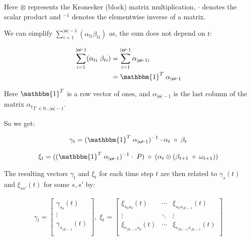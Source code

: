 Here $\otimes$ represents the Kronecker (block) matrix multiplication, $\cdot$ denotes the scalar product and $^{-1}$ denotes the elementwise inverse of a matrix.

We can simplify $\sum_{i=1}^{|\mathbf{o}|-1} (\alpha_{t i} \beta_{t i})$ as, the sum does not depend on $t$:

\begin{align}
    \sum_{i=1}^{|\mathbf{o}|-1} (\alpha_{t i} \; \beta_{t i}) &= \sum_{i=1}^{|\mathbf{o}|-1} \alpha_{|\mathbf{o}|-1 i} \\
    &= \mathbbm{1}^T \; \alpha_{|\mathbf{o}|-1}
\end{align}

Here $\mathbbm{1}^T$ is a row vector of ones, and $\alpha_{|\mathbf{o}|-1}$ is the last column of the matrix ${\alpha_t}_{T \;\in 0\dots|\mathbf{o}|-1}$.

So we get:

\begin{equation}
    {\gamma}_t = (\mathbbm{1}^T \; \alpha_{|\mathbf{o}|-1})^{-1} \cdot \alpha_t \; \circ \; \beta_t
    \label{eq:gamma-matrix-ones}
\end{equation}

\begin{equation}
    {\xi}_t = ((\mathbbm{1}^T \; \alpha_{|\mathbf{o}|-1})^{-1} \cdot \; {P}) \; \circ \;(\alpha_t \otimes (\beta_{t+1} \; \circ \; {\omega}_{t+1}))
    \label{eq:xi-matrix-ones}
\end{equation}

The resulting vectors ${\gamma}_t$ and ${\xi}_t$ for each time step $t$ are then related to $\gamma_s(t)$ and $\xi_{ss'}(t)$ for some $s, s'$ by:

\begin{align}
    {\gamma}_t = \begin{bmatrix}
                                \gamma_{s_0}(t)       \\
                                \vdots                \\
                                \gamma_{s_{|S|-1}}(t) \\
    \end{bmatrix}, \;
    {\xi}_t = \begin{bmatrix}
                             \xi_{s_0 s_0}(t)      & \cdots & \xi_{s_0 s_{|S|-1}}(t)      \\
                             \vdots                & \ddots & \vdots                      \\
                             \xi_{s_{|S|-1}s_0}(t) & \cdots & \xi_{s_{|S|-1}s_{|S|-1}}(t) \\
    \end{bmatrix}
\end{align}

